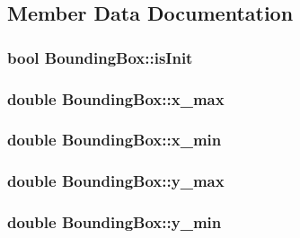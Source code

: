 \subsection{\-Member \-Data \-Documentation}
\hypertarget{struct_bounding_box_a050835e8b28af7e22b1101284c1b9c56}{
\subsubsection[{is\-Init}]{\setlength{\rightskip}{0pt plus 5cm}bool {\bf \-Bounding\-Box\-::is\-Init}}}\label{struct_bounding_box_a050835e8b28af7e22b1101284c1b9c56}
\hypertarget{struct_bounding_box_a891ce5859cdc2098d6dde313da10ab04}{
\subsubsection[{x\-\_\-max}]{\setlength{\rightskip}{0pt plus 5cm}double {\bf \-Bounding\-Box\-::x\-\_\-max}}}\label{struct_bounding_box_a891ce5859cdc2098d6dde313da10ab04}
\hypertarget{struct_bounding_box_adcf2b30a5b3b7fb9dc201d187c3ef358}{
\subsubsection[{x\-\_\-min}]{\setlength{\rightskip}{0pt plus 5cm}double {\bf \-Bounding\-Box\-::x\-\_\-min}}}\label{struct_bounding_box_adcf2b30a5b3b7fb9dc201d187c3ef358}
\hypertarget{struct_bounding_box_afa281b502b7c7dd3504fc0c5bc33a74e}{
\subsubsection[{y\-\_\-max}]{\setlength{\rightskip}{0pt plus 5cm}double {\bf \-Bounding\-Box\-::y\-\_\-max}}}\label{struct_bounding_box_afa281b502b7c7dd3504fc0c5bc33a74e}
\hypertarget{struct_bounding_box_aaa632fe0992cf6a336619c29aedb7014}{
\subsubsection[{y\-\_\-min}]{\setlength{\rightskip}{0pt plus 5cm}double {\bf \-Bounding\-Box\-::y\-\_\-min}}}\label{struct_bounding_box_aaa632fe0992cf6a336619c29aedb7014}
